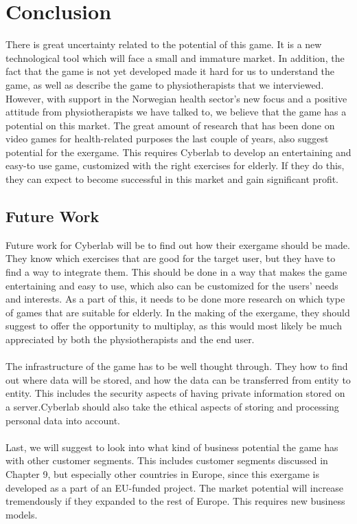 \chapter{Conclusion}
There is great uncertainty related to the potential of this game. It is a new technological tool which will face a small and immature market. In addition, the fact that the game is not yet developed made it hard for us to understand the game, as well as describe the game to physiotherapists that we interviewed. However, with support in the Norwegian health sector's new focus and a positive attitude from physiotherapists we have talked to, we believe that the game has a potential on this market. The great amount of research that has been done on video games for health-related purposes the last couple of years, also suggest potential for the exergame. This requires Cyberlab to develop an entertaining and easy-to use game, customized with the right exercises for elderly. If they do this, they can expect to become successful in this market and gain significant profit.  
\section{Future Work}
Future work for Cyberlab will be to find out how their exergame should be made. They know which exercises that are good for the target user, but they have to find a way to integrate them.  This should be done in a way that makes the game entertaining and easy to use, which also can be customized for the users’ needs and interests. As a part of this, it needs to be done more research on which type of games that are suitable for elderly.  In the making of the exergame, they should suggest to offer the opportunity to multiplay, as this would most likely be much appreciated by both the physiotherapists and the end user. \\ \\
The infrastructure of the game has to be well thought through. They how to find out where data will be stored, and how the data can be transferred from entity to entity. This includes the security aspects of having private information stored on a server.Cyberlab should also take the ethical aspects of storing and processing personal data into account. \\ \\
Last, we will suggest to look into what kind of business potential the game has with other customer segments. This includes customer segments discussed in Chapter 9, but especially other countries in Europe, since this exergame is developed as a part of an EU-funded project. The market potential will increase tremendously if they expanded to the rest of Europe. This requires new business models. \\ \\